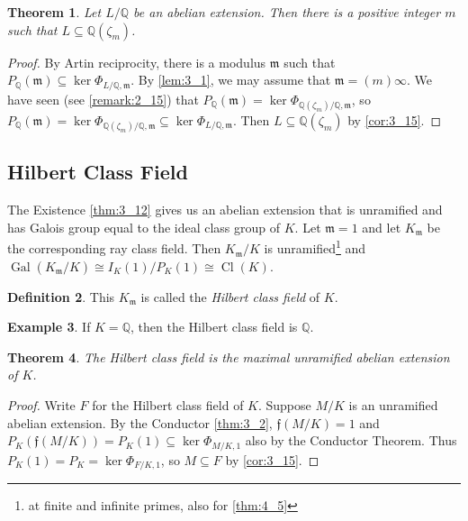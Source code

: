 \documentclass[11pt]{article}
\theoremstyle{definition}
\newtheorem{definition}{Definition}[section]
\newtheorem{example}[definition]{Example}
\theoremstyle{plain}
\newtheorem{theorem}[definition]{Theorem}
\theoremstyle{remark}
\DeclareMathOperator{\Gal}{Gal}
\DeclareMathOperator{\Cl}{Cl}
\newcommand{\QQ}{\mathbb{Q}}
\newcommand{\ff}{\mathfrak{f}}
\newcommand{\fm}{\mathfrak{m}}
\begin{document}
\begin{theorem}\label{thm:4_1}
    Let $L/\QQ$ be an abelian extension. Then there is a positive integer $m$ such that $L \subseteq \QQ(\zeta_m)$.
\end{theorem}
\begin{proof}
    By Artin reciprocity, there is a modulus $\fm$ such that $P_\QQ(\fm) \subseteq \ker \Phi_{L/\QQ, \fm}$. By \autoref{lem:3_1}, we may assume that $\fm = (m) \infty$. We have seen (see \autoref{remark:2_15}) that $P_\QQ(\fm) = \ker \Phi_{\QQ(\zeta_m)/\QQ, \fm}$, so $P_\QQ(\fm) = \ker \Phi_{\QQ(\zeta_m)/\QQ, \fm} \subseteq \ker \Phi_{L/\QQ, \fm}$. Then $L \subseteq \QQ(\zeta_m)$ by \autoref{cor:3_15}.
\end{proof}

\subsection{Hilbert Class Field}

The Existence \autoref{thm:3_12} gives us an abelian extension that is unramified and has Galois group equal to the ideal class group of $K$. Let $\fm = 1$ and let $K_\fm$ be the corresponding ray class field. Then $K_\fm / K$ is unramified\footnote{at finite and infinite primes, also for \autoref{thm:4_5}} and $\Gal(K_\fm/K) \cong I_K(1) / P_K(1) \cong \Cl(K)$.


\begin{definition}\label{def:4_3}
    This $K_\fm$ is called the \emph{Hilbert class field} of $K$.
\end{definition}

\begin{example}\label{eg:4_4}
    If $K = \QQ$, then the Hilbert class field is $\QQ$.
\end{example}

\begin{theorem}\label{thm:4_5}
    The Hilbert class field is the maximal unramified abelian extension of $K$.
\end{theorem}
\begin{proof}
    Write $F$ for the Hilbert class field of $K$. Suppose $M/K$ is an unramified abelian extension. By the Conductor \autoref{thm:3_2}, $\ff(M/K) = 1$ and $P_K(\ff(M/K)) = P_K(1) \subseteq \ker \Phi_{M/K, 1}$ also by the Conductor Theorem. Thus $P_K(1) = P_K = \ker \Phi_{F/K, 1}$, so $M \subseteq F$ by \autoref{cor:3_15}.
\end{proof}
\end{document}
